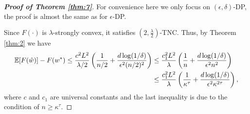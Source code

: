 \documentclass[12pt]{alt2022} %
\begin{document}
\begin{proof}[{\bf Proof of Theorem \ref{thm:7}}]
For convenience here we only focus on $(\epsilon,\delta)$-DP, the proof is almost the same as for $\epsilon$-DP. 

Since $F(\cdot)$ is $\lambda$-strongly convex, it satisfies $(2, \frac{\lambda}{2})$-TNC. Thus, by Theorem \ref{thm:2} we have
\begin{align}\label{eq11}
\mathbb{E}[F(\hat{w})]-F(w^*)\leq \frac{c^2L^2}{\lambda/2}\left(\frac{1}{n/2}+\frac{d\log(1/\delta)}{\epsilon^2 (n/2)^2}\right)&\leq\frac{c_1^2L^2}{\lambda}\left(\frac{1}{n}+\frac{d\log(1/\delta)}{\epsilon^2n^2}\right) \notag \\
&\leq \frac{c_1^2L^2}{\lambda}\left(\frac{1}{\kappa^{\tau}}+\frac{d\log(1/\delta)}{\epsilon^2\kappa^{2\tau}}\right),
\end{align}
where $c$ and $c_1$ are universal constants and the last inequality is due to the condition of $n\geq \kappa^\tau$. 


\end{proof}
\end{document}

